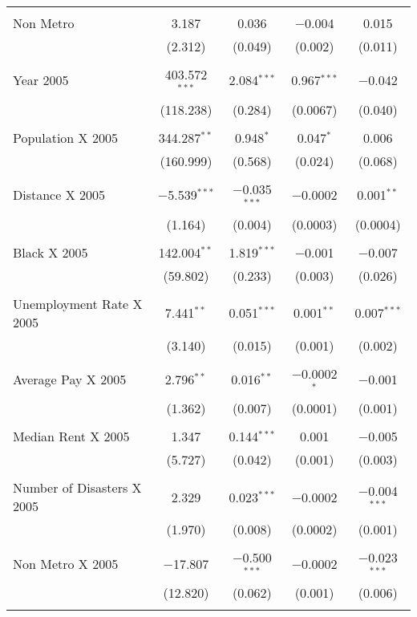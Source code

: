 \documentclass[]{article}
\begin{document}
\begin{table}[!htbp]
\begin{tabular}{@{\extracolsep{5pt}}lcccc}
  & & & & \\ 
 Non Metro & 3.187 & 0.036 & $-$0.004 & 0.015 \\ 
  & (2.312) & (0.049) & (0.002) & (0.011) \\ 
  & & & & \\ 
 Year 2005 & 403.572$^{***}$ & 2.084$^{***}$ & 0.967$^{***}$ & $-$0.042 \\ 
  & (118.238) & (0.284) & (0.0067) & (0.040) \\ 
  & & & & \\ 
 Population X 2005 & 344.287$^{**}$ & 0.948$^{*}$ & 0.047$^{*}$ & 0.006 \\ 
  & (160.999) & (0.568) & (0.024) & (0.068) \\ 
  & & & & \\ 
 Distance X 2005 & $-$5.539$^{***}$ & $-$0.035$^{***}$ & $-$0.0002 & 0.001$^{**}$ \\ 
  & (1.164) & (0.004) & (0.0003) & (0.0004) \\ 
  & & & & \\ 
 Black X 2005 & 142.004$^{**}$ & 1.819$^{***}$ & $-$0.001 & $-$0.007 \\ 
  & (59.802) & (0.233) & (0.003) & (0.026) \\ 
  & & & & \\ 
 Unemployment Rate X 2005  & 7.441$^{**}$ & 0.051$^{***}$ & 0.001$^{**}$ & 0.007$^{***}$ \\ 
  & (3.140) & (0.015) & (0.001) & (0.002) \\ 
  & & & & \\ 
 Average Pay X 2005 & 2.796$^{**}$ & 0.016$^{**}$ & $-$0.0002$^{*}$ & $-$0.001 \\ 
  & (1.362) & (0.007) & (0.0001) & (0.001) \\ 
  & & & & \\ 
 Median Rent X 2005 & 1.347 & 0.144$^{***}$ & 0.001 & $-$0.005 \\ 
  & (5.727) & (0.042) & (0.001) & (0.003) \\ 
  & & & & \\ 
 Number of Disasters X 2005 & 2.329 & 0.023$^{***}$ & $-$0.0002 & $-$0.004$^{***}$ \\ 
  & (1.970) & (0.008) & (0.0002) & (0.001) \\ 
  & & & & \\ 
 Non Metro X 2005 & $-$17.807 & $-$0.500$^{***}$ & $-$0.0002 & $-$0.023$^{***}$ \\ 
  & (12.820) & (0.062) & (0.001) & (0.006) \\ 
  & & & & \\ 

\end{tabular}
\end{table}
\end{document}
